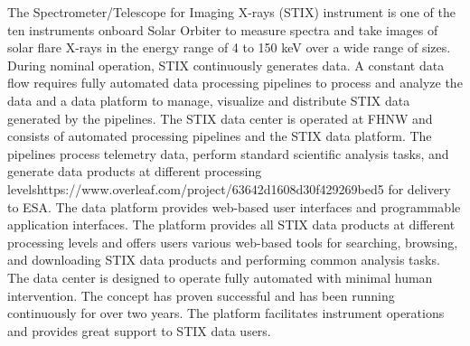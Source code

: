 \documentclass[referee]{aa} %
\begin{document}
  \abstract
   { The Spectrometer/Telescope for Imaging X-rays (STIX) instrument is one 
   of the ten instruments onboard Solar Orbiter to measure spectra and take images of solar flare X-rays in the energy range of 4 to 150 keV over a wide range of sizes.} %
   {During nominal operation, STIX continuously generates data. A constant data flow requires fully automated data processing pipelines to process and analyze the data and a data platform to manage, visualize and distribute STIX data generated by the pipelines.
   }
   {
   The STIX data center is operated at FHNW and consists of automated processing pipelines and the STIX data platform. The pipelines process telemetry data, perform standard scientific analysis tasks, and generate data products at different processing levelshttps://www.overleaf.com/project/63642d1608d30f429269bed5 for delivery to ESA. The data platform provides web-based user interfaces and programmable application interfaces. }
   {
   The platform provides all STIX data products at different processing levels and offers users various web-based tools for searching, browsing, and downloading STIX data products and performing common analysis tasks. The data center is designed to operate fully automated with minimal human intervention. The concept has proven successful and has been running continuously for over two years. The platform facilitates instrument operations and provides great support to STIX data users.}
 {}
   \maketitle

\end{document}
